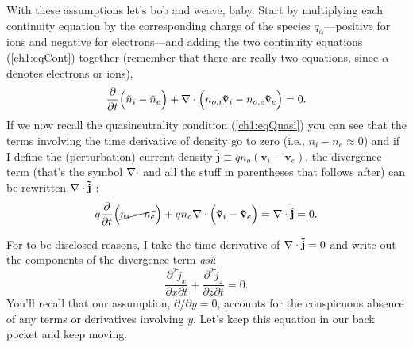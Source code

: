 With these assumptions let's bob and weave, baby. Start by multiplying each
continuity equation by the corresponding charge of the species
$q_\alpha$---positive for ions and negative for electrons---and adding the two
continuity equations (\ref{ch1:eqCont}) together (remember that there are really
two equations, since $\alpha$ denotes electrons or ions),
\begin{equation} \label{ch1:eqCont1} \dfrac{\partial}{\partial t} \Big (
  \tilde n_i - \tilde n_e \Big ) + {\bf \nabla} \cdot \Big (n_{o,i} \mathbf{\tilde v}_i - n_{o,e}
  \mathbf{\tilde v}_{e} \Big ) = 0.
\end{equation}
If we now recall the quasineutrality condition (\ref{ch1:eqQuasi}) you can see
that the terms involving the time derivative of density go to zero (i.e., $n_i -
n_e \approx 0$) and if I define the (perturbation) current density $\mathbf{\tilde j} \equiv q n_o (
\mathbf{v}_i - \mathbf{v}_e )$, the divergence term (that's the symbol ${\bf \nabla}
\cdot$ and all the stuff in parentheses that follows after) can be rewritten
${\bf \nabla} \cdot \mathbf{\tilde j}$ :
\begin{equation*} 
  q\dfrac{\partial}{\partial t} \Big ( \cancel{n_i - n_e} \Big )
  + q n_o {\bf \nabla} \cdot \Big ( \mathbf{\tilde v}_i - \mathbf{\tilde v}_{e} \Big ) = {\bf \nabla}
  \cdot \mathbf{\tilde j} = 0.
\end{equation*}

For to-be-disclosed reasons, I take the time derivative of ${\bf \nabla} \cdot
\mathbf{\tilde j} = 0$ and write out the components of the divergence term
\emph{as\'{i}}:
\begin{equation} 
  \label{ch1:eqCont2} \dfrac{\partial^2 \tilde j_x}{\partial x \partial t} + \dfrac{\partial^2 \tilde j_z}{\partial z \partial t} = 0.
\end{equation}
You'll recall that our assumption, $\partial / \partial y = 0$, accounts for the
conspicuous absence of any terms or derivatives involving $y$. Let's keep this
equation in our back pocket and keep moving.

